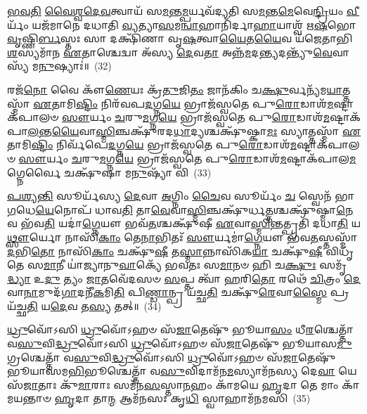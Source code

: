 \-\ul{𑌭}\-\-\ul{𑌵}\-\-\ul{𑌤𑌿} \ul{𑌵𑍈}\-\-\ul{𑌶𑍍𑌵}\-\-\ul{𑌦𑍇}\-\-\ul{𑌵}\-𑌤𑍍𑌵𑌾𑌯᳴ 𑌸\-\ul{𑌮}\-𑌨𑍍𑌤\-\ul{𑌮𑍍𑌪}\-𑌰𑍍𑌯𑌵᳴𑌦𑍍𑌯𑌤𑌿 𑌸\-\ul{𑌮}\-𑌨𑍍𑌤\-\ul{𑌮𑍇}\-𑌵𑍇\-\ul{𑌨𑍍𑌦𑍍𑌰𑌿}\-𑌯𑌂 \ul{𑌵𑍀}\-𑌰𑍍𑌯𑌂᳴ 𑌯𑌜᳴𑌮𑌾𑌨𑍇 𑌦𑌧𑌾𑌤𑌿 \ul{𑌵𑍍𑌯}\-𑌤𑍍𑌯𑌾\-\ul{𑌸}\-𑌮\-\ul{𑌨𑍍𑌵𑌾}\-𑌹𑌾𑌨𑌿᳴𑌰𑍍𑌦𑌾\-\ul{𑌹𑌾}\-𑌯𑌾𑌶𑍍𑌵᳴ 𑌋\-\ul{𑌷}\-𑌭𑍋 \ul{𑌵𑍃}\-𑌷𑍍𑌣𑌿\-\ul{𑌰𑍍𑌬}\-𑌸𑍍𑌤𑌃 𑌸𑌾 𑌦𑌕𑍍𑌷𑌿᳴𑌣𑌾 𑌵𑍃\-\ul{𑌷}\-𑌤𑍍𑌵𑌾\-\ul{𑌯𑍈}\-𑌤\-\ul{𑌯𑍈}\-𑌵 𑌯᳴𑌜𑍇𑌤𑌾𑌭𑌿\-\ul{𑌶}\-𑌸𑍍𑌯𑌮𑌾᳴𑌨 \ul{𑌏}\-𑌤𑌾𑌶𑍍𑌚𑍇𑌦𑍍𑌵𑌾 𑌅᳴𑌸𑍍𑌯 \ul{𑌦𑍇}\-𑌵\-\ul{𑌤𑌾} 𑌅𑌨𑍍𑌨᳴\-\ul{𑌮}\-𑌦\-\ul{𑌨𑍍𑌤𑍍𑌯}\-𑌦𑌨𑍍𑌤𑍍𑌯𑍁᳴\-\ul{𑌵𑍇}\-𑌵𑌾𑌸𑍍𑌯᳴ 𑌮\-\ul{𑌨𑍁}\-𑌷𑍍𑌯𑌾𑌃॑॥~(32)

{\anuvakamend[{\-\ul{𑌇}\-\-\ul{𑌨𑍍𑌦𑍍𑌰𑌿}\-𑌯𑌕𑌾᳴𑌮𑌃 𑌸\-\ul{𑌵𑌿}\-𑌤𑍁𑌸𑍍𑌤𑍇\-\ul{𑌜}\-𑌸𑍍𑌤𑌤𑍍𑌪𑍁᳴\-\ul{𑌰𑍋}\-𑌡𑌾\-\ul{𑌶𑍋}\-\-𑌽𑌷𑍍𑌟𑌾𑌤𑍍𑌰𑌿𑍞᳴𑌶𑌚𑍍𑌚}]}%

𑌰𑌜᳴\-\ul{𑌨𑍋} 𑌵𑍈 𑌕𑍗᳴\-\ul{𑌣𑍇}\-𑌯𑌃 𑌕𑍍𑌰᳴\-\ul{𑌤𑍁}\-𑌜𑌿\-\ul{𑌤𑌂} 𑌜𑌾𑌨᳴𑌕𑌿𑌂 𑌚\-\ul{𑌕𑍍𑌷𑍁}\-𑌰𑍍𑌵𑌨𑍍𑌯᳴𑌮\-\ul{𑌯𑌾}\-𑌤𑍍𑌤𑌸𑍍𑌮𑌾᳴ \ul{𑌏}\-𑌤𑌾𑌮𑌿\-\ul{𑌷𑍍𑌟𑌿𑌂} 𑌨𑌿𑌰᳴𑌵𑌪\-\ul{𑌦}\-𑌗𑍍𑌨\-\ul{𑌯𑍇} 𑌭𑍍𑌰𑌾𑌜᳴𑌸𑍍𑌵𑌤𑍇 𑌪𑍁\-\ul{𑌰𑍋}\-𑌡𑌾𑌶᳴\-\-\ul{𑌮}\-𑌷𑍍𑌟𑌾𑌕᳴𑌪𑌾𑌲𑍞 \ul{𑌸𑍗}\-𑌰𑍍𑌯𑌂 \ul{𑌚}\-𑌰𑍁\-\ul{𑌮}\-𑌗𑍍𑌨\-\ul{𑌯𑍇} 𑌭𑍍𑌰𑌾𑌜᳴𑌸𑍍𑌵𑌤𑍇 𑌪𑍁\-\ul{𑌰𑍋}\-𑌡𑌾𑌶᳴\-\-\ul{𑌮}\-𑌷𑍍𑌟𑌾𑌕᳴𑌪𑌾\-\ul{𑌲}\-𑌨𑍍𑌤\-\ul{𑌯𑍈}\-𑌵𑌾\-\ul{𑌸𑍍𑌮𑌿}\-𑌞𑍍𑌚𑌕𑍍𑌷𑍁᳴𑌰𑌦\-\ul{𑌧𑌾}\-𑌦𑍍𑌯𑌶𑍍𑌚𑌕𑍍𑌷𑍁᳴𑌷𑍍𑌕𑌾\-\ul{𑌮𑌃} 𑌸𑍍𑌯𑌾𑌤𑍍𑌤𑌸𑍍𑌮𑌾᳴ \ul{𑌏}\-𑌤𑌾𑌮𑌿\-\ul{𑌷𑍍𑌟𑌿𑌂} 𑌨𑌿𑌰𑍍𑌵᳴𑌪𑍇\-\ul{𑌦}\-𑌗𑍍𑌨\-\ul{𑌯𑍇} 𑌭𑍍𑌰𑌾𑌜᳴𑌸𑍍𑌵𑌤𑍇 𑌪𑍁\-\ul{𑌰𑍋}\-𑌡𑌾𑌶᳴\-\-\ul{𑌮}\-𑌷𑍍𑌟𑌾𑌕᳴𑌪𑌾𑌲𑍞 \ul{𑌸𑍗}\-𑌰𑍍𑌯𑌂 \ul{𑌚}\-𑌰𑍁\-\ul{𑌮}\-𑌗𑍍𑌨\-\ul{𑌯𑍇} 𑌭𑍍𑌰𑌾𑌜᳴𑌸𑍍𑌵𑌤𑍇 𑌪𑍁\-\ul{𑌰𑍋}\-𑌡𑌾𑌶᳴\-\-\ul{𑌮}\-𑌷𑍍𑌟𑌾𑌕᳴𑌪𑌾𑌲\-\ul{𑌮}\-𑌗𑍍𑌨𑍇𑌰𑍍𑌵𑍈 𑌚𑌕𑍍𑌷𑍁᳴𑌷𑌾 𑌮\-\ul{𑌨𑍁}\-𑌷𑍍𑌯𑌾᳴ 𑌵𑌿~(33)

\-\ul{𑌪}\-\-\ul{𑌶𑍍𑌯}\-\-\ul{𑌨𑍍𑌤𑌿} 𑌸𑍂𑌰𑍍𑌯᳴𑌸𑍍𑌯 \ul{𑌦𑍇}\-𑌵𑌾 \ul{𑌅}\-𑌗𑍍𑌨𑌿𑌂 \ul{𑌚𑍈}\-𑌵 𑌸𑍂𑌰𑍍𑌯𑌂᳴ \ul{𑌚} 𑌸𑍍𑌵𑍇𑌨᳴ 𑌭𑌾\-\ul{𑌗}\-𑌧𑍇\-\ul{𑌯𑍇}\-𑌨𑍋𑌪᳴ 𑌧𑌾𑌵\-\ul{𑌤𑌿} 𑌤𑌾\-\ul{𑌵𑍇}\-𑌵𑌾\-\ul{𑌸𑍍𑌮𑌿}\-𑌞𑍍𑌚𑌕𑍍𑌷𑍁᳴𑌰𑍍𑌧\-\ul{𑌤𑍍𑌤}\-𑌶𑍍𑌚𑌕𑍍𑌷𑍁᳴𑌷𑍍𑌮𑌾\-\ul{𑌨𑍇}\-𑌵 𑌭᳴𑌵\-\ul{𑌤𑌿} 𑌯𑌦𑌾॑\-\ul{𑌗𑍍𑌨𑍇}\-𑌯𑍗 𑌭𑌵᳴\-\ul{𑌤}\-𑌶𑍍𑌚𑌕𑍍𑌷𑍁᳴𑌷𑍀 \ul{𑌏}\-𑌵𑌾\-\ul{𑌸𑍍𑌮𑌿}\-𑌨𑍍𑌤𑌤𑍍𑌪𑍍𑌰𑌤𑌿᳴ 𑌦𑌧𑌾\-\ul{𑌤𑌿} 𑌯\-\ul{𑌥𑍍𑌸𑍗}\-𑌰𑍍𑌯𑍋 𑌨𑌾𑌸𑌿᳴\-\ul{𑌕𑌾𑌂} 𑌤𑍇\-\ul{𑌨𑌾}\-𑌭𑌿𑌤𑌃᳴ \ul{𑌸𑍗}\-𑌰𑍍𑌯𑌮𑌾॑\-\ul{𑌗𑍍𑌨𑍇}\-𑌯𑍗 𑌭᳴𑌵\-\ul{𑌤}\-𑌸𑍍𑌤𑌸𑍍𑌮𑌾᳴\-\ul{𑌦}\-𑌭𑌿\-\ul{𑌤𑍋} 𑌨𑌾𑌸𑌿᳴\-\ul{𑌕𑌾𑌂} 𑌚𑌕𑍍𑌷𑍁᳴\-\ul{𑌷𑍀} 𑌤\-\ul{𑌸𑍍𑌮𑌾}\-𑌨𑍍𑌨𑌾𑌸𑌿᳴𑌕\-\ul{𑌯𑌾} 𑌚𑌕𑍍𑌷𑍁᳴\-\ul{𑌷𑍀} 𑌵𑌿𑌧𑍃᳴𑌤𑍇 𑌸\-\ul{𑌮𑌾}\-𑌨𑍀 𑌯𑌾॑𑌜𑍍𑌯𑌾𑌨𑍁\-\ul{𑌵𑌾}\-𑌕𑍍𑌯𑍇᳴ 𑌭𑌵𑌤𑌃 𑌸\-\ul{𑌮𑌾}\-𑌨𑍞 𑌹𑌿 𑌚\-\ul{𑌕𑍍𑌷𑍁𑌃} 𑌸𑌮𑍃᳴\-\ul{𑌦𑍍𑌧𑍍𑌯𑌾} 𑌉\-\ul{𑌦𑍁} 𑌤𑍍𑌯𑌂 \ul{𑌜𑌾}\-𑌤𑌵𑍇᳴𑌦𑌸𑍞 \ul{𑌸}\-𑌪𑍍𑌤 𑌤𑍍𑌵𑌾᳴ \ul{𑌹}\-𑌰𑌿\-\ul{𑌤𑍋} 𑌰𑌥𑍇᳴ \ul{𑌚𑌿}\-𑌤𑍍𑌰𑌂 \ul{𑌦𑍇}\-𑌵𑌾\-\ul{𑌨𑌾}\-𑌮𑍁𑌦᳴\-\ul{𑌗𑌾}\-𑌦𑌨𑍀᳴\-\ul{𑌕}\-𑌮𑌿\-\ul{𑌤𑌿} 𑌪𑌿\-\ul{𑌣𑍍𑌡𑌾}\-𑌨𑍍𑌪𑍍𑌰 𑌯᳴𑌚𑍍𑌛\-\ul{𑌤𑌿} 𑌚𑌕𑍍𑌷𑍁᳴\-\ul{𑌰𑍇}\-𑌵𑌾\-\ul{𑌸𑍍𑌮𑍈} 𑌪𑍍𑌰 𑌯᳴𑌚𑍍𑌛\-\ul{𑌤𑌿} 𑌯\-\ul{𑌦𑍇}\-𑌵 𑌤\-\ul{𑌸𑍍𑌯} 𑌤𑌤𑍍॥~(34)

{\anuvakamend[{𑌵𑌿 𑌹𑍍𑌯᳴𑌷𑍍𑌟𑌾𑌵𑌿𑍞᳴𑌶𑌤𑌿𑌶𑍍𑌚}]}%

\-\ul{𑌧𑍍𑌰𑍁}\-𑌵𑍋᳴\-𑌽𑌸𑌿 \ul{𑌧𑍍𑌰𑍁}\-𑌵𑍋᳴\-𑌽𑌹𑍞 𑌸᳴\-\ul{𑌜𑌾}\-𑌤𑍇𑌷𑍁᳴ 𑌭𑍂𑌯𑌾\-\ul{𑌸𑌂} 𑌧𑍀\-\ul{𑌰}\-𑌶𑍍𑌚𑍇𑌤𑍍𑌤𑌾᳴ 𑌵\-\ul{𑌸𑍁}\-𑌵𑌿\-\ul{𑌦𑍍𑌧𑍍𑌰𑍁}\-𑌵𑍋᳴\-𑌽𑌸𑌿 \ul{𑌧𑍍𑌰𑍁}\-𑌵𑍋᳴\-𑌽𑌹𑍞 𑌸᳴\-\ul{𑌜𑌾}\-𑌤𑍇𑌷𑍁᳴ 𑌭𑍂𑌯𑌾𑌸\-\ul{𑌮𑍁}\-𑌗𑍍𑌰𑌶𑍍𑌚𑍇𑌤𑍍𑌤𑌾᳴ 𑌵\-\ul{𑌸𑍁}\-𑌵𑌿\-\ul{𑌦𑍍𑌧𑍍𑌰𑍁}\-𑌵𑍋᳴\-𑌽𑌸𑌿 \ul{𑌧𑍍𑌰𑍁}\-𑌵𑍋᳴\-𑌽𑌹𑍞 𑌸᳴\-\ul{𑌜𑌾}\-𑌤𑍇𑌷𑍁᳴ 𑌭𑍂𑌯𑌾𑌸𑌮\-\ul{𑌭𑌿}\-𑌭𑍂𑌶𑍍𑌚𑍇𑌤𑍍𑌤𑌾᳴ 𑌵\-\ul{𑌸𑍁}\-𑌵𑌿𑌦𑌾𑌮᳴𑌨\-\ul{𑌮}\-𑌸𑍍𑌯𑌾𑌮᳴𑌨𑌸𑍍𑌯 𑌦𑍇\-\ul{𑌵𑌾} 𑌯𑍇 𑌸᳴\-\ul{𑌜𑌾}\-𑌤𑌾𑌃 𑌕𑍁᳴\-\ul{𑌮𑌾}\-𑌰𑌾𑌃 𑌸𑌮᳴𑌨\-\ul{𑌸}\-𑌸𑍍𑌤𑌾\-\ul{𑌨}\-𑌹𑌂 𑌕𑌾᳴𑌮𑌯𑍇 \ul{𑌹𑍃}\-𑌦𑌾 𑌤𑍇 𑌮𑌾𑌂 𑌕𑌾᳴𑌮𑌯𑌨𑍍𑌤𑌾𑍞 \ul{𑌹𑍃}\-𑌦𑌾 𑌤𑌾\-\ul{𑌨𑍍𑌮} 𑌆𑌮᳴𑌨𑌸𑌃 𑌕𑍃\-\ul{𑌧𑌿} 𑌸𑍍𑌵𑌾𑌹𑌾𑌮᳴𑌨𑌮𑌸𑌿~(35)

